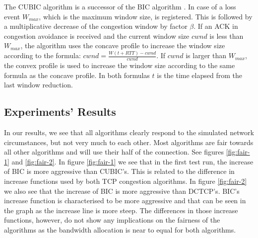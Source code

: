 \documentclass{article}
\begin{document}
The CUBIC algorithm is a successor of the BIC algorithm \cite{cubic-tcp-congestion}. In case of a loss event $W_{max}$, which is the maximum window size, is registered. This is followed by a multiplicative decrease of the congestion window by factor $\beta$. If an ACK in congestion avoidance is received and the current window size $cwnd$ is less than $W_{max}$, the algorithm uses the concave profile to increase the window size according to the formula: $cwnd = \frac{W(t+RTT)-cwnd}{cwnd}$. If $cwnd$ is larger than $W_{max}$, the convex profile is used to increase the window size according to the same formula as the concave profile. In both formulas $t$ is the time elapsed from the last window reduction.


\subsection{Experiments' Results}\label{sub:experiment-results}

In our results, we see that all algorithms clearly respond to the simulated
network circumstances, but not very much to each other. Most algorithms are
fair towards all other algorithms and will use their half of the connection.
See figures \ref{fig:fair-1} and \ref{fig:fair-2}. In figure \ref{fig:fair-1} we see that in the first test run, the increase of BIC is more aggressive than CUBIC's. This is related to the difference in increase functions used by both TCP congestion algorithms. In figure \ref{fig:fair-2} we also see that the increase of BIC is more aggressive than DCTCP's. BIC's increase function is characterised to be more aggressive and that can be seen in the graph as the increase line is more steep. The differences in those increase functions, however, do not show any implications on the fairness of the algorithms as the bandwidth allocation is near to equal for both algorithms. 
\end{document}
